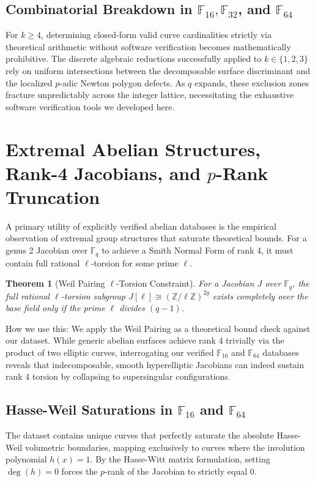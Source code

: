 \documentclass[letterpaper, 11pt]{article}
\newtheorem{theorem}{Theorem}[section]
\begin{document}
\subsection{Combinatorial Breakdown in \texorpdfstring{$\mathbb{F}_{16}, \mathbb{F}_{32}$}{F\_16, F\_32}, and \texorpdfstring{$\mathbb{F}_{64}$}{F\_64}}
For $k \ge 4$, determining closed-form valid curve cardinalities strictly via theoretical arithmetic without software verification becomes mathematically prohibitive. The discrete algebraic reductions successfully applied to $k \in \{1, 2, 3\}$ rely on uniform intersections between the decomposable surface discriminant and the localized $p$-adic Newton polygon defects. As $q$ expands, these exclusion zones fracture unpredictably across the integer lattice, necessitating the exhaustive software verification tools we developed here.

\section{Extremal Abelian Structures, Rank-4 Jacobians, and \texorpdfstring{$p$}{p}-Rank Truncation}
A primary utility of explicitly verified abelian databases is the empirical observation of extremal group structures that saturate theoretical bounds. For a genus 2 Jacobian over $\mathbb{F}_q$ to achieve a Smith Normal Form of rank 4, it must contain full rational $\ell$-torsion for some prime $\ell$.

\begin{theorem}[Weil Pairing $\ell$-Torsion Constraint]
For a Jacobian $J$ over $\mathbb{F}_q$, the full rational $\ell$-torsion subgroup $J[\ell] \cong (\mathbb{Z}/\ell\mathbb{Z})^{2g}$ exists completely over the base field only if the prime $\ell$ divides $(q-1)$.
\end{theorem}

How we use this: We apply the Weil Pairing as a theoretical bound check against our dataset. While generic abelian surfaces achieve rank 4 trivially via the product of two elliptic curves, interrogating our verified $\mathbb{F}_{16}$ and $\mathbb{F}_{64}$ databases reveals that indecomposable, smooth hyperelliptic Jacobians can indeed sustain rank 4 torsion by collapsing to supersingular configurations. 

\subsection{Hasse-Weil Saturations in \texorpdfstring{$\mathbb{F}_{16}$}{F\_16} and \texorpdfstring{$\mathbb{F}_{64}$}{F\_64}}
The dataset contains unique curves that perfectly saturate the absolute Hasse-Weil volumetric boundaries, mapping exclusively to curves where the involution polynomial $h(x) = 1$. By the Hasse-Witt matrix formulation, setting $\deg(h) = 0$ forces the $p$-rank of the Jacobian to strictly equal 0. 
\end{document}
